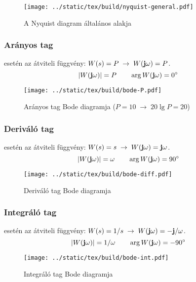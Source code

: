 \documentclass[../main.tex]{subfiles}
\begin{document}
\begin{figure}[H]
  \centering
  \texttt{[image: ../static/tex/build/nyquist-general.pdf]} 
  \caption{A Nyquist diagram általános alakja}
  \label{fig:nyquist}
\end{figure}

\subsubsection*{Arányos tag}

 esetén az átviteli függvény: $W(s) = P \; \rightarrow \; W(\mathbf{j} \omega) = P$.
\[
  |W(\mathbf{j} \omega)| = P
  \qquad
  \arg W(\mathbf{j} \omega) = 0^\circ
\]

\begin{figure}[H]
  \centering
  \texttt{[image: ../static/tex/build/bode-P.pdf]} 
  \caption{Arányos tag Bode diagramja ($P=10 \; \rightarrow \; 20\lg P = 20$)}
  \label{fig:bode-P}
\end{figure}


\subsubsection*{Deriváló tag}

 esetén az átviteli függvény: $W(s) = s \; \rightarrow \; W(\mathbf{j} \omega) = \mathbf{j} \omega$.
\[
  |W(\mathbf{j} \omega)| = \omega
  \qquad
  \arg W(\mathbf{j} \omega) = 90^\circ
\]

\begin{figure}[H]
  \centering
  \texttt{[image: ../static/tex/build/bode-diff.pdf]} 
  \caption{Deriváló tag Bode diagramja}
  \label{fig:bode-diff}
\end{figure}

\subsubsection*{Integráló tag}

 esetén az átviteli függvény: $W(s) = 1/s \; \rightarrow \; W(\mathbf{j} \omega) = -\mathbf{j} / \omega$.
\[
  |W(\mathbf{j} \omega)| = 1 / \omega
  \qquad
  \arg W(\mathbf{j} \omega) = -90^\circ
\]

\begin{figure}[H]
  \centering
  \texttt{[image: ../static/tex/build/bode-int.pdf]} 
  \caption{Integráló tag Bode diagramja}
  \label{fig:bode-int}
\end{figure}
\end{document}
